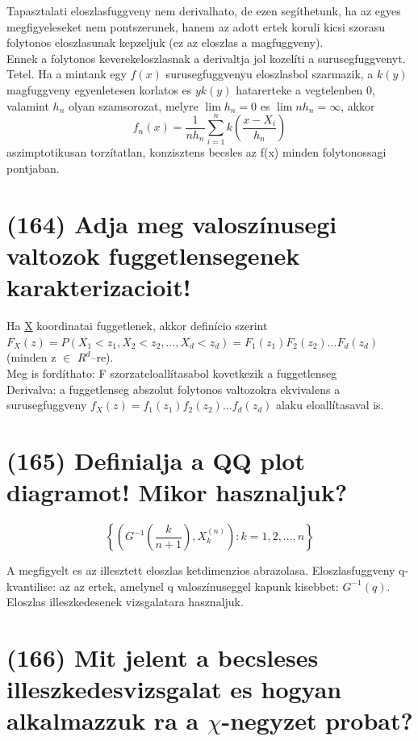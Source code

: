 \documentclass[12p]{article}
\begin{document}
Tapasztalati eloszlasfuggveny nem derivalhato, de ezen segíthetunk, ha az egyes megfigyeleseket nem pontszerunek, hanem az adott ertek koruli kicsi szorasu folytonos eloszlasunak kepzeljuk (ez az eloszlas a magfuggveny).\\
Ennek a folytonos keverekeloszlasnak a derivaltja jol kozelíti a surusegfuggvenyt.\\
Tetel. Ha a mintank egy $f(x)$ surusegfuggvenyu
eloszlasbol szarmazik, a $k(y)$ magfuggveny
egyenletesen korlatos es $yk(y)$ hatarerteke a
vegtelenben 0, valamint $h_n$ olyan szamsorozat,
melyre $\lim h_n = 0$ es $\lim nh_n = \infty$, akkor
$$f_n(x) = \frac{1}{nh_n} \sum^{n}_{i=1}k\left(\frac{x-X_i}{h_n}\right)$$ 
aszimptotikusan torzítatlan, konzisztens becsles az f(x) minden folytonossagi pontjaban.

\section{(164) Adja meg valoszínusegi valtozok fuggetlensegenek karakterizacioit!}

Ha \underline{X} koordinatai fuggetlenek, akkor definício szerint\\
$F_X(z)=P(X_1<z_1, X_2< z_2,..., X_d<z_d)=F_1(z_1)F_2(z_2)...F_d(z_d)$ (minden z $\in$ $R^d$–re).\\
Meg is fordíthato: F szorzateloallítasabol kovetkezik a fuggetlenseg\\
Derivalva: a fuggetlenseg abszolut folytonos valtozokra ekvivalens a surusegfuggveny 
$f_X(z)=f_1(z_1)f_2(z_2)...f_d(z_d)$ alaku eloallítasaval is.

\section{(165) Definialja a QQ plot diagramot! Mikor hasznaljuk?}

$$\left\{\left(G^{-1}\left(\frac{k}{n+1}\right), X_k^{(n)}\right):k=1,2,...,n\right\}$$

A megfigyelt es az illesztett eloszlas ketdimenzios abrazolasa. Eloszlasfuggveny q-kvantilise: az az ertek, amelynel q valoszínuseggel kapunk kisebbet: $G^{-1}(q)$.\\
Eloszlas illeszkedesenek vizsgalatara hasznaljuk.

\section{(166) Mit jelent a becsleses illeszkedesvizsgalat es hogyan alkalmazzuk ra a $\chi$-negyzet probat?}
\end{document}
